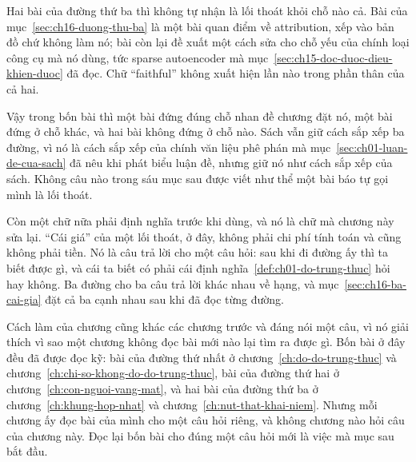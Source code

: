 Hai bài của đường thứ ba thì không tự nhận là lối thoát khỏi chỗ nào cả. Bài của
mục~\ref{sec:ch16-duong-thu-ba} là một bài quan điểm về attribution, xếp
 vào bản đồ chứ không làm nó;
bài còn lại đề xuất một cách sửa cho chỗ yếu của chính loại công cụ mà nó dùng,
tức sparse autoencoder mà mục~\ref{sec:ch15-doc-duoc-dieu-khien-duoc} đã đọc.
Chữ \enquote{faithful} không xuất hiện lần nào trong phần thân của cả hai.

%
Vậy trong bốn bài thì một bài đứng đúng chỗ nhan đề chương đặt nó, một bài đứng
ở chỗ khác, và hai bài không đứng ở chỗ nào. Sách vẫn giữ cách sắp xếp ba đường,
vì nó là cách sắp xếp của chính văn liệu phê phán mà
mục~\ref{sec:ch01-luan-de-cua-sach} đã nêu khi phát biểu luận đề, nhưng giữ nó
như cách sắp xếp của sách. Không câu nào trong sáu mục sau được viết như thể một
bài báo tự gọi mình là lối thoát.

%
Còn một chữ nữa phải định nghĩa trước khi dùng, và nó là chữ mà chương này sửa
lại. \enquote{Cái giá} của một lối thoát, ở đây, không phải chi phí tính toán và
cũng không phải tiền. Nó là câu trả lời cho một câu hỏi: sau khi đi đường ấy thì
ta biết được gì, và cái ta biết có phải cái định nghĩa~\ref{def:ch01-do-trung-thuc}
hỏi hay không. Ba đường cho ba câu trả lời khác nhau về hạng, và
mục~\ref{sec:ch16-ba-cai-gia} đặt cả ba cạnh nhau sau khi đã đọc từng đường.

%
Cách làm của chương cũng khác các chương trước và đáng nói một câu, vì nó giải
thích vì sao một chương không đọc bài mới nào lại tìm ra được gì. Bốn bài ở đây
đều đã được đọc kỹ: bài của đường thứ nhất ở
chương~\ref{ch:do-do-trung-thuc} và chương~\ref{ch:chi-so-khong-do-do-trung-thuc},
bài của đường thứ hai ở chương~\ref{ch:con-nguoi-vang-mat}, và hai bài của đường
thứ ba ở chương~\ref{ch:khung-hop-nhat} và chương~\ref{ch:nut-that-khai-niem}.
Nhưng mỗi chương ấy đọc bài của mình cho một câu hỏi riêng, và không chương nào
hỏi câu của chương này. Đọc lại bốn bài cho đúng một câu hỏi mới là việc mà mục
sau bắt đầu.
